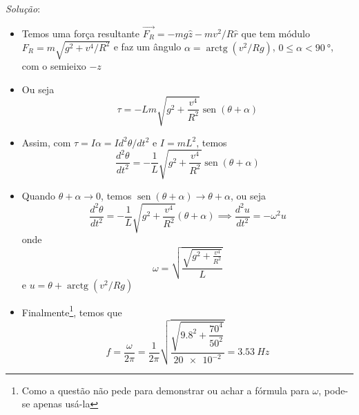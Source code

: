 \documentclass[12pt,a4paper,brazilian, fleqn]{article}
\DeclareMathOperator{\sen}{sen}
\DeclareMathOperator{\arctg}{arctg}
\renewcommand{\vec}[1]{\overrightarrow{#1}}
\begin{document}
\textit{Solução}:

\begin{itemize}
    \item Temos uma força resultante \(\vec{F_R} = -mg \hat{z}-mv^2/R \hat{r}\) que tem módulo
        \(F_R = m\sqrt{g^2 + v^4/R^2}\) e faz um ângulo \(\alpha = \arctg{(v^2/Rg)}\), \(0 \leq \alpha < \SI{90}{\degree}\),
        com o semieixo \(-z\)

        \begin{center}
        \end{center}

    \item Ou seja
        \[
            \tau = -Lm\sqrt{g^2+\frac{v^4}{R^2}}\sen{(\theta+\alpha)}
        \]
    \item Assim, com \(\tau = I\alpha=I d^2 \theta/dt^2\) e \(I=mL^2\), temos
        \[
            \frac{d^2 \theta}{dt^2}=-\frac{1}{L}\sqrt{g^2+\frac{v^4}{R^2}}\sen{(\theta+\alpha)}
        \]
    \item Quando \(\theta +\alpha \to 0\), temos \(\sen(\theta+\alpha) \to \theta + \alpha\), ou seja
        \[
            \frac{d^2 \theta}{dt^2}=-\frac{1}{L}\sqrt{g^2+\frac{v^4}{R^2}}(\theta+\alpha) \implies
            \frac{d^2 u}{dt^2}=-\omega^2 u
        \]
        onde
        \[
            \omega = \sqrt{\frac{\sqrt{g^2+\frac{v^4}{R^2}}}{L}}
        \]
        e \(u=\theta + \arctg({v^2/Rg})\)

    \item Finalmente\footnote{Como a questão não pede para demonstrar ou achar a fórmula para \(\omega\), pode-se apenas usá-la}, 
        temos que 
        \[
            f=\frac{\omega}{2\pi} = 
            \frac{1}{2\pi} \sqrt{\frac{\sqrt{\num{9.8}^2+\dfrac{\num{70}^4}{\num{50}^2}}}{\num{20e-2}}}
            = \SI{3.53}{Hz}
        \]
\end{itemize}
\end{document}
